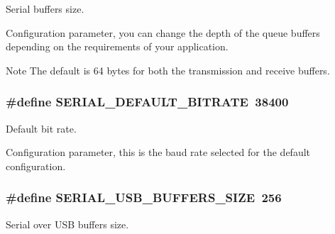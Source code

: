 Serial buffers size. 

Configuration parameter, you can change the depth of the queue buffers depending on the requirements of your application. \begin{DoxyNote}{Note}
The default is 64 bytes for both the transmission and receive buffers. 
\end{DoxyNote}
\hypertarget{group__HAL__CONF_gacb4c08ac23f83ac9d58c50ff840de516}{
\subsubsection[{S\+E\+R\+I\+A\+L\+\_\+\+D\+E\+F\+A\+U\+L\+T\+\_\+\+B\+I\+T\+R\+A\+T\+E}]{\setlength{\rightskip}{0pt plus 5cm}\#define S\+E\+R\+I\+A\+L\+\_\+\+D\+E\+F\+A\+U\+L\+T\+\_\+\+B\+I\+T\+R\+A\+T\+E~38400}}\label{group__HAL__CONF_gacb4c08ac23f83ac9d58c50ff840de516}


Default bit rate. 

Configuration parameter, this is the baud rate selected for the default configuration. \hypertarget{group__HAL__CONF_ga24727a5407c6a41af53b59588592da80}{
\subsubsection[{S\+E\+R\+I\+A\+L\+\_\+\+U\+S\+B\+\_\+\+B\+U\+F\+F\+E\+R\+S\+\_\+\+S\+I\+Z\+E}]{\setlength{\rightskip}{0pt plus 5cm}\#define S\+E\+R\+I\+A\+L\+\_\+\+U\+S\+B\+\_\+\+B\+U\+F\+F\+E\+R\+S\+\_\+\+S\+I\+Z\+E~256}}\label{group__HAL__CONF_ga24727a5407c6a41af53b59588592da80}


Serial over U\+S\+B buffers size. 

